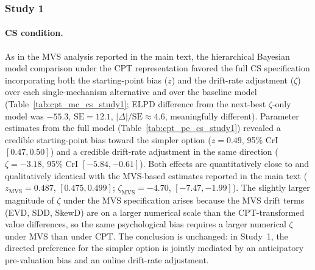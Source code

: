 \documentclass[man,floatsintext]{apa7}
\begin{document}
\subsubsection{Study 1}

\paragraph{CS condition.} As in the MVS analysis reported in the main text, the hierarchical Bayesian model comparison under the CPT representation favored the full CS specification incorporating both the starting-point bias ($z$) and the drift-rate adjustment ($\zeta$) over each single-mechanism alternative and over the baseline model (Table~\ref{tab:cpt_mc_cs_study1}; ELPD difference from the next-best $\zeta$-only model was $-55.3$, $\mathrm{SE} = 12.1$, $|\Delta|/\mathrm{SE} \approx 4.6$, meaningfully different). Parameter estimates from the full model (Table~\ref{tab:cpt_pe_cs_study1}) revealed a credible starting-point bias toward the simpler option (\textbf{$z = 0.49$}, 95\% CrI $[0.47, 0.50]$) and a credible drift-rate adjustment in the same direction (\textbf{$\zeta = -3.18$}, 95\% CrI $[-5.84, -0.61]$). Both effects are quantitatively close to and qualitatively identical with the MVS-based estimates reported in the main text ($z_{\text{MVS}} = 0.487$, $[0.475, 0.499]$; $\zeta_{\text{MVS}} = -4.70$, $[-7.47, -1.99]$). The slightly larger magnitude of $\zeta$ under the MVS specification arises because the MVS drift terms (EVD, SDD, SkewD) are on a larger numerical scale than the CPT-transformed value differences, so the same psychological bias requires a larger numerical $\zeta$ under MVS than under CPT. The conclusion is unchanged: in Study~1, the directed preference for the simpler option is jointly mediated by an anticipatory pre-valuation bias and an online drift-rate adjustment.
\end{document}

